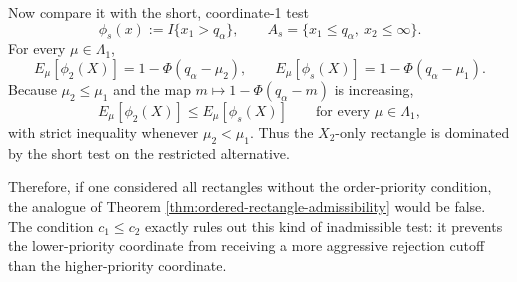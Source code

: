 \documentclass[12pt]{article}
\theoremstyle{definition}
\theoremstyle{remark}
\begin{document}
Now compare it with the short, coordinate-1 test
\[
\phi_s(x):=I\{x_1>q_\alpha\},
\qquad
A_s=\{x_1\le q_\alpha,\ x_2\le\infty\}.
\]
For every $\mu\in\Lambda_1$,
\[
E_\mu[\phi_2(X)]
=1-\Phi(q_\alpha-\mu_2),
\qquad
E_\mu[\phi_s(X)]
=1-\Phi(q_\alpha-\mu_1).
\]
Because $\mu_2\le\mu_1$ and the map $m\mapsto 1-\Phi(q_\alpha-m)$ is increasing,
\[
E_\mu[\phi_2(X)]
\le
E_\mu[\phi_s(X)]
\qquad\text{for every }\mu\in\Lambda_1,
\]
with strict inequality whenever $\mu_2<\mu_1$. Thus the $X_2$-only rectangle is dominated by the short test on the restricted alternative.

Therefore, if one considered all rectangles without the order-priority condition, the analogue of Theorem \ref{thm:ordered-rectangle-admissibility} would be false. The condition $c_1\le c_2$ exactly rules out this kind of inadmissible test: it prevents the lower-priority coordinate from receiving a more aggressive rejection cutoff than the higher-priority coordinate.
\end{document}
